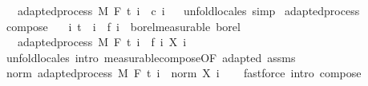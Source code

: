 \begin{isabellebody}
\ \ \ {\isachardoublequoteopen}adapted{\isacharunderscore}{\kern0pt}process\ M\ F\ t\ {\isacharparenleft}{\kern0pt}{\isasymlambda}i\ {\isacharunderscore}{\kern0pt}{\isachardot}{\kern0pt}\ c\ i{\isacharparenright}{\kern0pt}{\isachardoublequoteclose}%
\isadelimproof
\ %
\endisadelimproof
%
\isatagproof
{}\isamarkupfalse%
\ {\isacharparenleft}{\kern0pt}unfold{\isacharunderscore}{\kern0pt}locales{\isacharparenright}{\kern0pt}\ simp%
\endisatagproof
{\isafoldproof}%
%
\isadelimproof
%
\endisadelimproof
\isanewline
\isanewline
{}\isamarkupfalse%
\ adapted{\isacharunderscore}{\kern0pt}process\isanewline
{}\isanewline
\isanewline
{}\isamarkupfalse%
\ compose{\isacharcolon}{\kern0pt}\isanewline
\ \ \ {\isachardoublequoteopen}{\isasymAnd}i{\isachardot}{\kern0pt}\ t\ {\isasymle}\ i\ {\isasymLongrightarrow}\ f\ i\ {\isasymin}\ borel{\isacharunderscore}{\kern0pt}measurable\ borel{\isachardoublequoteclose}\isanewline
\ \ \ {\isachardoublequoteopen}adapted{\isacharunderscore}{\kern0pt}process\ M\ F\ t\ {\isacharparenleft}{\kern0pt}{\isasymlambda}i\ {\isasymxi}{\isachardot}{\kern0pt}\ {\isacharparenleft}{\kern0pt}f\ i{\isacharparenright}{\kern0pt}\ {\isacharparenleft}{\kern0pt}X\ i\ {\isasymxi}{\isacharparenright}{\kern0pt}{\isacharparenright}{\kern0pt}{\isachardoublequoteclose}\isanewline
%
\isadelimproof
\ \ %
\endisadelimproof
%
\isatagproof
{}\isamarkupfalse%
\ {\isacharparenleft}{\kern0pt}unfold{\isacharunderscore}{\kern0pt}locales{\isacharparenright}{\kern0pt}\ {\isacharparenleft}{\kern0pt}intro\ measurable{\isacharunderscore}{\kern0pt}compose{\isacharbrackleft}{\kern0pt}OF\ adapted\ assms{\isacharbrackright}{\kern0pt}{\isacharparenright}{\kern0pt}%
\endisatagproof
{\isafoldproof}%
%
\isadelimproof
\isanewline
%
\endisadelimproof
\isanewline
{}\isamarkupfalse%
\ norm{\isacharcolon}{\kern0pt}\ {\isachardoublequoteopen}adapted{\isacharunderscore}{\kern0pt}process\ M\ F\ t\ {\isacharparenleft}{\kern0pt}{\isasymlambda}i\ {\isasymxi}{\isachardot}{\kern0pt}\ norm\ {\isacharparenleft}{\kern0pt}X\ i\ {\isasymxi}{\isacharparenright}{\kern0pt}{\isacharparenright}{\kern0pt}{\isachardoublequoteclose}%
\isadelimproof
\ %
\endisadelimproof
%
\isatagproof
{}\isamarkupfalse%
\ {\isacharparenleft}{\kern0pt}fastforce\ intro{\isacharcolon}{\kern0pt}\ compose{\isacharparenright}{\kern0pt}%
\endisatagproof
{\isafoldproof}%
%

\end{isabellebody}
